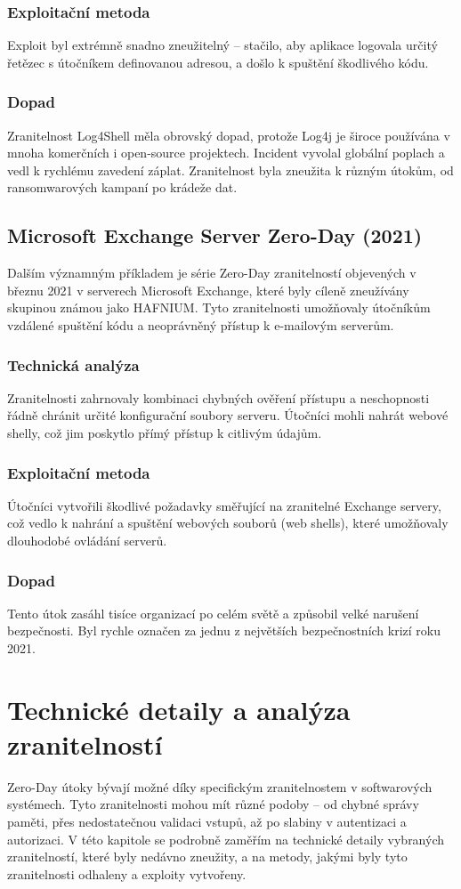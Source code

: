 \documentclass[11pt, conference, a4paper]{IEEEtran}
\begin{document}
\subsubsection{Exploitační metoda} Exploit byl extrémně snadno zneužitelný – stačilo, aby aplikace logovala určitý řetězec s útočníkem definovanou adresou, a došlo k spuštění škodlivého kódu.
\subsubsection{Dopad} Zranitelnost Log4Shell měla obrovský dopad, protože Log4j je široce používána v mnoha komerčních i open-source projektech. Incident vyvolal globální poplach a vedl k rychlému zavedení záplat. Zranitelnost byla zneužita k různým útokům, od ransomwarových kampaní po krádeže dat.
\subsection{Microsoft Exchange Server Zero-Day (2021)}
Dalším významným příkladem je série Zero-Day zranitelností objevených v březnu 2021 v serverech Microsoft Exchange, které byly cíleně zneužívány skupinou známou jako HAFNIUM. Tyto zranitelnosti umožňovaly útočníkům vzdálené spuštění kódu a neoprávněný přístup k e-mailovým serverům.

\subsubsection{Technická analýza} Zranitelnosti zahrnovaly kombinaci chybných ověření přístupu a neschopnosti řádně chránit určité konfigurační soubory serveru. Útočníci mohli nahrát webové shelly, což jim poskytlo přímý přístup k citlivým údajům.
\subsubsection{Exploitační metoda} Útočníci vytvořili škodlivé požadavky směřující na zranitelné Exchange servery, což vedlo k nahrání a spuštění webových souborů (web shells), které umožňovaly dlouhodobé ovládání serverů.
\subsubsection{Dopad} Tento útok zasáhl tisíce organizací po celém světě a způsobil velké narušení bezpečnosti. Byl rychle označen za jednu z největších bezpečnostních krizí roku 2021.
\section{Technické detaily a analýza zranitelností}
Zero-Day útoky bývají možné díky specifickým zranitelnostem v softwarových systémech. Tyto zranitelnosti mohou mít různé podoby – od chybné správy paměti, přes nedostatečnou validaci vstupů, až po slabiny v autentizaci a autorizaci. V této kapitole se podrobně zaměřím na technické detaily vybraných zranitelností, které byly nedávno zneužity, a na metody, jakými byly tyto zranitelnosti odhaleny a exploity vytvořeny.
\end{document}
